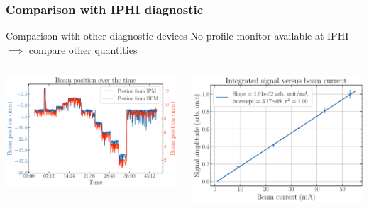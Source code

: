 \begin{frame}[t]
  \frametitle{Comparison with IPHI diagnostic}
  \begin{block}{Comparison with other diagnostic devices}
    No profile monitor available at IPHI $\implies$ compare other quantities
  \end{block}
  \begin{columns}[T]
    \begin{column}{0.45\textwidth}
      \includegraphics[width=1.14\textwidth]{04_Test/fig/fig000_beam_car_a}
    \end{column}
    \begin{column}{0.45\textwidth}
      \includegraphics[width=1\textwidth]{04_Test/fig/fig000_current_sweep_a}
    \end{column}
  \end{columns}
  \begin{columns}[T]

\end{columns}
\end{frame}
